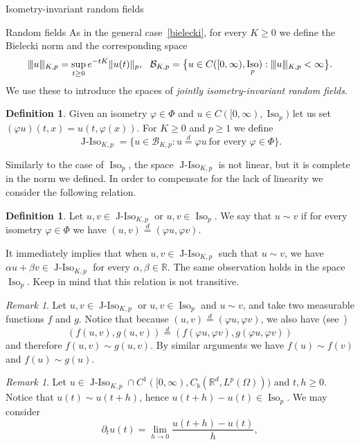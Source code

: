 \documentclass[a4paper,10pt,fleqn]{amsart}
\theoremstyle{remark}
\newtheorem{remark}[theorem]{Remark}
\theoremstyle{definition}
\newtheorem{definition}[theorem]{Definition}
\DeclareMathOperator{\Iso}{Iso}
\DeclareMathOperator{\JIso}{J-Iso}
\newcommand{\dt} {\partial_t}
\newcommand{\X} {{\mathbb{R}^d}}
\newcommand{\R} {\mathbb{R}}
\newcommand{\T} {[0,\infty)}
\renewcommand{\phi} {\varphi}
\renewcommand{\=} {\overset{d}{=}}
\newcommand{\viii} {|\kern-0.25ex|\kern-0.25ex|}
\newcommand{\K}[2] {\viii #1 \viii_{K,#2}}
\newcommand{\Lp} {{L^p(\Omega)}}
\begin{document}
\begin{section}{Isometry-invariant random fields}
\begin{subsection}{Random fields}
   As in the general case~\eqref{bielecki}, for every $K\geq0$ 
  we define the Bielecki norm and the corresponding space
  \begin{align*}
   &\K{u}{p} = \sup_{t\geq0}e^{-tK}\|u(t)\|_p,
   &\!\mathcal{B}_{K,p} = \big\{u\in C(\T,\Iso_p) : \K{u}{p} < \infty\big\}.
  \end{align*}
     We use these to introduce the spaces of \emph{jointly isometry-invariant random fields}.
  \begin{definition}\label{jiso-def}
  Given an isometry $\phi\in\Phi$ and $u\in C(\T,\Iso_p)$ let us set $(\phi u)(t,x) = u(t,\phi(x))$.
  For $K\geq0$ and $p\geq1$ we define
  \begin{equation*}
      \JIso_{K,p} = \big\{u\in \mathcal{B}_{K,p} : u \= \phi u\ \text{for every $\phi\in\Phi$}\big\}.
  \end{equation*}
  \end{definition}
  Similarly to the case of $\Iso_p$, the space $\JIso_{K,p}$ is not linear, but it is complete in the norm we defined. In order to compensate for the lack of linearity we consider the following relation.
  \begin{definition}
    Let $u,v\in \JIso_{K,p}$ or $u,v\in\Iso_p$.
    We say that $u\sim v$ if for every isometry $\phi\in\Phi$ we have $(u,v) \= (\phi u,\phi v)$.
  \end{definition}
  It immediately implies that when $u,v\in\JIso_{K,p}$ such that $u\sim v$,
  we have $\alpha u + \beta v\in\JIso_{K,p}$ for every $\alpha,\beta\in\R$.
  The same observation holds in the space $\Iso_p$. Keep in mind that this
  relation is not transitive.
  \begin{remark}
   Let $u,v\in\JIso_{K,p}$ or $u,v\in\Iso_p$ and $u\sim v$, and take two measurable functions $f$ and $g$.
   Notice that because $(u,v)\= (\phi u, \phi v)$, we also have (see~\cite[Theorem 25.7]{MR1324786})
   \begin{equation*}
    (f(u,v),g(u,v))\= (f(\phi u,\phi v),g(\phi u,\phi v))
   \end{equation*}
   and therefore $f(u,v)\sim g(u,v)$.
   By similar arguments we have $f(u)\sim f(v)$ and $f(u)\sim g(u)$.
  \end{remark}
  \begin{remark}
  Let $u\in\JIso_{K,p}\cap C^1(\T,C_b(\X,\Lp))$ and $t,h\geq0$. Notice that $u(t)\sim u(t+h)$, hence $u(t+h)-u(t)\in\Iso_p$. 
    We may consider 
    \begin{equation}\label{derivative}
      \dt u (t) = \lim_{h\to 0} \frac{u(t+h)-u(t)}{h},

\end{equation}
\end{remark}
\end{subsection}
\end{section}
\end{document}
